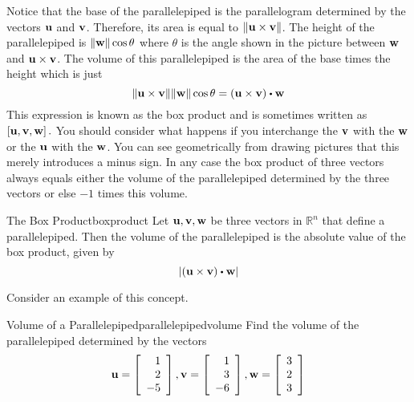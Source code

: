 Notice that the base of the parallelepiped is the parallelogram
determined by the vectors ${\bf u}$ and ${\bf v}$. Therefore, its area is equal to 
$\| {\bf u}\times {\bf v} \| $. The height of the parallelepiped
is $\| {\bf w}\| \cos \theta $ where $\theta $ is the angle
shown in the picture between ${\bf w}$ and ${\bf u}\times {\bf v}$.
The volume of this parallelepiped is the area of the base times
the height which is just
\begin{equation*}
\vectlength \vect{u}\times \vect{v}\vectlength \vectlength \vect{w}\vectlength \cos \theta =
\left( \vect{u}\times\vect{v}\right) \dotprod \vect{w}
\end{equation*}
This expression is known as the box product and is sometimes written as 
$\left[ {\bf u},{\bf v},{\bf w}\right] .$
You should consider what happens if you interchange the 
${\bf v}$ with the ${\bf w}$ or the ${\bf u}$ with the ${\bf w}$.
You can see geometrically from drawing pictures that this merely introduces
a minus sign. In any case the box product of three vectors always equals
either the volume of the parallelepiped determined by the three vectors or
else $-1$ times this volume.

\begin{proposition}{The Box Product}{boxproduct}
Let ${\bf u}, {\bf v}, {\bf w}$ be three vectors in $\mathbb{R}^n$ that define a parallelepiped. Then the volume of the parallelepiped is the absolute value of the box product, given by 
\[
\left| \left(\vect{u}\times\vect{v}\right) \dotprod \vect{w} \right|
\]
\end{proposition}

Consider an example of this concept.

\begin{example}{Volume of a Parallelepiped}{parallelepipedvolume}
Find the volume of the parallelepiped determined by the vectors
\begin{equation*}
{\bf u}
=
\left[
\begin{array}{r}
1 \\
2 \\
-5
\end{array}
\right], 
{\bf v}
=
\left[
\begin{array}{r}
1 \\
3 \\
-6
\end{array}
\right], 
{\bf w}
=
\left[
\begin{array}{r}
3 \\
2 \\
3
\end{array}
\right]
\end{equation*}
\end{example}

